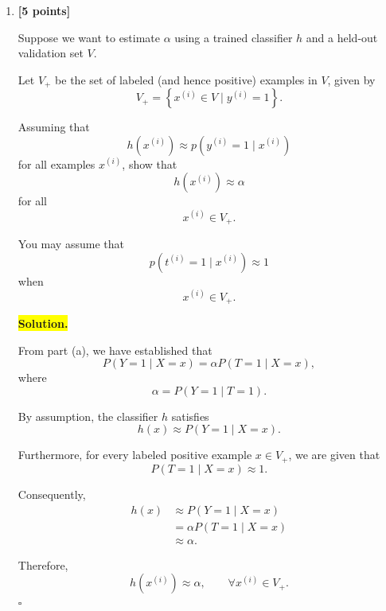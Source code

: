 \documentclass[10pt]{article}
\begin{document}
\begin{enumerate}
\begin{enumerate}[label=(\alph*)]
We know that negative examples are never labeled:
\[
\mathbb P(Y=1\mid T=0,X=x)=0.
\]
Furthermore, we know that labeling probability
among true positive examples is independent of $X$:
\[
\mathbb P(Y=1\mid T=1,X=x)
=
\mathbb P(Y=1\mid T=1)
=:\alpha.
\]
Then the conditional law of total probability gives
\[
\mathbb P(Y=1\mid X=x)
=
\alpha\,\mathbb P(T=1\mid X=x).
\]
Therefore, provided $\alpha>0$,
\[
\boxed{
\mathbb P(T=1\mid X=x)
=
\frac{\mathbb P(Y=1\mid X=x)}{\alpha}.
}
\]



\item \textbf{[5 points]}

Suppose we want to estimate $\alpha$ using a trained classifier $h$
and a held-out validation set $V$.

Let $V_+$ be the set of labeled (and hence positive) examples in $V$,
given by
\[
V_+
=
\left\{
x^{(i)}\in V
\mid
y^{(i)}=1
\right\}.
\]

Assuming that
\[
h(x^{(i)})
\approx
p(y^{(i)}=1\mid x^{(i)})
\]
for all examples $x^{(i)}$, show that
\[
h(x^{(i)})
\approx
\alpha
\]
for all
\[
x^{(i)}\in V_+.
\]

You may assume that
\[
p(t^{(i)}=1\mid x^{(i)})
\approx1
\]
when
\[
x^{(i)}\in V_+.
\]


\medskip
\noindent\colorbox{yellow}{\textbf{Solution.}}
\vspace{3mm}

From part (a), we have established that
\[
P(Y=1\mid X=x)
=
\alpha P(T=1\mid X=x),
\]
where
\[
\alpha=P(Y=1\mid T=1).
\]

By assumption, the classifier $h$ satisfies
\[
h(x)\approx P(Y=1\mid X=x).
\]

Furthermore, for every labeled positive example $x\in V_+$,
we are given that
\[
P(T=1\mid X=x)\approx 1.
\]

Consequently,
\[
\begin{aligned}
h(x)
&\approx P(Y=1\mid X=x)\\
&=\alpha P(T=1\mid X=x)\\
&\approx\alpha.
\end{aligned}
\]

Therefore,
\[
\boxed{
h(x^{(i)})\approx\alpha,
\qquad \forall x^{(i)}\in V_+.
}
\]
\hfill $\square$



\end{enumerate}
\end{enumerate}
\end{document}
